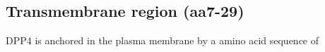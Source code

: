 \subsection{Transmembrane region (aa7-29)}

DPP4 is anchored in the plasma membrane by a amino acid sequence of 